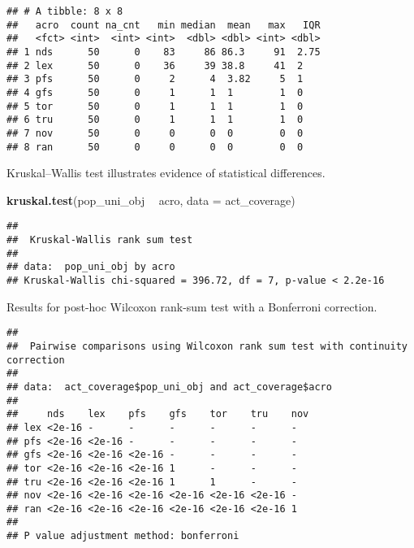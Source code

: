 \documentclass[]{book}
\newenvironment{Shaded}{\begin{snugshade}}{\end{snugshade}}
\newcommand{\DataTypeTok}[1]{\textcolor[rgb]{0.13,0.29,0.53}{#1}}
\newcommand{\KeywordTok}[1]{\textcolor[rgb]{0.13,0.29,0.53}{\textbf{#1}}}
\newcommand{\NormalTok}[1]{#1}
\newcommand{\OperatorTok}[1]{\textcolor[rgb]{0.81,0.36,0.00}{\textbf{#1}}}
\newcommand{\OtherTok}[1]{\textcolor[rgb]{0.56,0.35,0.01}{#1}}
\newcommand{\StringTok}[1]{\textcolor[rgb]{0.31,0.60,0.02}{#1}}
\begin{document}
\begin{verbatim}
## # A tibble: 8 x 8
##   acro  count na_cnt   min median  mean   max   IQR
##   <fct> <int>  <int> <int>  <dbl> <dbl> <int> <dbl>
## 1 nds      50      0    83     86 86.3     91  2.75
## 2 lex      50      0    36     39 38.8     41  2   
## 3 pfs      50      0     2      4  3.82     5  1   
## 4 gfs      50      0     1      1  1        1  0   
## 5 tor      50      0     1      1  1        1  0   
## 6 tru      50      0     1      1  1        1  0   
## 7 nov      50      0     0      0  0        0  0   
## 8 ran      50      0     0      0  0        0  0
\end{verbatim}

Kruskal--Wallis test illustrates evidence of statistical differences.

\begin{Shaded}
\begin{Highlighting}[]
\KeywordTok{kruskal.test}\NormalTok{(pop_uni_obj }\OperatorTok{~}\StringTok{ }\NormalTok{acro, }\DataTypeTok{data =}\NormalTok{ act_coverage)}
\end{Highlighting}
\end{Shaded}

\begin{verbatim}
## 
##  Kruskal-Wallis rank sum test
## 
## data:  pop_uni_obj by acro
## Kruskal-Wallis chi-squared = 396.72, df = 7, p-value < 2.2e-16
\end{verbatim}

Results for post-hoc Wilcoxon rank-sum test with a Bonferroni correction.

\begin{Shaded}
\end{Shaded}

\begin{verbatim}
## 
##  Pairwise comparisons using Wilcoxon rank sum test with continuity correction 
## 
## data:  act_coverage$pop_uni_obj and act_coverage$acro 
## 
##     nds    lex    pfs    gfs    tor    tru    nov
## lex <2e-16 -      -      -      -      -      -  
## pfs <2e-16 <2e-16 -      -      -      -      -  
## gfs <2e-16 <2e-16 <2e-16 -      -      -      -  
## tor <2e-16 <2e-16 <2e-16 1      -      -      -  
## tru <2e-16 <2e-16 <2e-16 1      1      -      -  
## nov <2e-16 <2e-16 <2e-16 <2e-16 <2e-16 <2e-16 -  
## ran <2e-16 <2e-16 <2e-16 <2e-16 <2e-16 <2e-16 1  
## 
## P value adjustment method: bonferroni
\end{verbatim}
\end{document}
